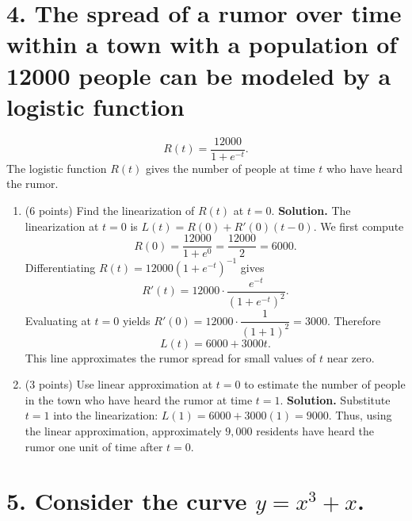 \documentclass[12pt]{article}
\begin{document}
\newpage

\section*{4. The spread of a rumor over time within a town with a population of 12000 people can be modeled by a logistic function}
\[ R(t) = \frac{12000}{1+e^{-t}}. \]
The logistic function $R(t)$ gives the number of people at time $t$ who have heard the rumor.

\begin{enumerate}[label=(\alph*)]
    \item (6 points) Find the linearization of $R(t)$ at $t=0$.
    {\color{blue}\textbf{Solution.} The linearization at $t=0$ is $L(t)=R(0)+R'(0)(t-0)$. We first compute
    \[
        R(0)=\frac{12000}{1+e^{0}}=\frac{12000}{2}=6000.
    \]
    Differentiating $R(t)=12000(1+e^{-t})^{-1}$ gives
    \[
        R'(t)=12000\cdot\frac{e^{-t}}{(1+e^{-t})^2}.
    \]
    Evaluating at $t=0$ yields $R'(0)=12000\cdot\dfrac{1}{(1+1)^2}=3000$. Therefore
    \[
        L(t)=6000+3000t.
    \]
    This line approximates the rumor spread for small values of $t$ near zero.}
    
    \item (3 points) Use linear approximation at $t=0$ to estimate the number of people in the town who have heard the rumor at time $t=1$.
    {\color{blue}\textbf{Solution.} Substitute $t=1$ into the linearization: $L(1)=6000+3000(1)=9000$. Thus, using the linear approximation, approximately $9{,}000$ residents have heard the rumor one unit of time after $t=0$.}

\end{enumerate}

\newpage

\section*{5. Consider the curve $y=x^3+x$.}
\end{document}
